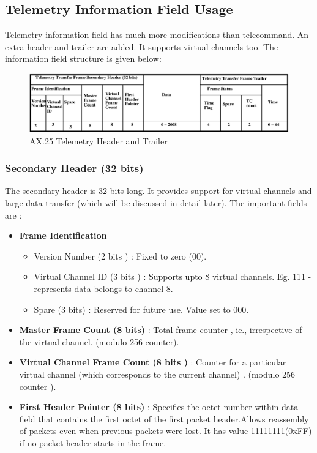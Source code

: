 \documentclass[BTech]{iitmdiss}
\begin{document}
\subsection{Telemetry Information Field Usage }
Telemetry information field has much more modifications than telecommand. An extra header and trailer are added. It supports virtual channels too. The information field structure is given below: 
\newline
\begin{figure}[H]
\includegraphics[scale = 0.5]{ax25telemetry.eps}
\caption{AX.25 Telemetry Header and Trailer }
\label{fig:ax25telemetry}
\end{figure}
\subsubsection{Secondary Header (32 bits) }
The secondary header is 32 bits long. It provides support for virtual channels and large data transfer (which will be discussed in detail later). The important fields are :
\begin{itemize}
\item \textbf{Frame Identification }
\begin{itemize}
\item Version Number (2 bits ) : Fixed to zero (00).
\item Virtual Channel ID (3 bits ) : Supports upto 8 virtual channels. Eg. 111 - represents data belongs to channel 8.
\item Spare (3 bits) : Reserved for future use. Value set to 000.
\end{itemize}
\item \textbf{Master Frame Count (8 bits)} : Total frame counter , ie., irrespective of the virtual channel. (modulo 256 counter).
\item \textbf{Virtual Channel Frame Count (8 bits ) }: Counter for a particular virtual channel (which corresponds to the current channel) . (modulo 256 counter ).
\item \textbf{First Header Pointer (8 bits) }: Specifies the octet number within data field that contains the first octet of the first packet header.Allows reassembly of packets even when previous packets were lost.
It has value 11111111(0xFF) if no packet header starts in the frame.


\end{itemize}
\end{document}
